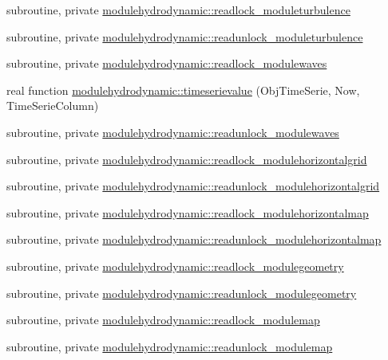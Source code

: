 \begin{DoxyCompactItemize}
\item 
subroutine, private \mbox{\hyperlink{namespacemodulehydrodynamic_aca47e0fe75006cf9be3be10af982ba2c}{modulehydrodynamic\+::readlock\+\_\+moduleturbulence}}
\item 
subroutine, private \mbox{\hyperlink{namespacemodulehydrodynamic_a894329be6f1d95af1f87b82950558271}{modulehydrodynamic\+::readunlock\+\_\+moduleturbulence}}
\item 
subroutine, private \mbox{\hyperlink{namespacemodulehydrodynamic_af607bb807c6d67a54a48586646880d77}{modulehydrodynamic\+::readlock\+\_\+modulewaves}}
\item 
real function \mbox{\hyperlink{namespacemodulehydrodynamic_a5ac5205b827b25fab464de95d2c838bf}{modulehydrodynamic\+::timeserievalue}} (Obj\+Time\+Serie, Now, Time\+Serie\+Column)
\item 
subroutine, private \mbox{\hyperlink{namespacemodulehydrodynamic_a652c0bf5742de7f1bc1ccdd771297bbc}{modulehydrodynamic\+::readunlock\+\_\+modulewaves}}
\item 
subroutine, private \mbox{\hyperlink{namespacemodulehydrodynamic_a87327c743a7173e47122b62474c77ea7}{modulehydrodynamic\+::readlock\+\_\+modulehorizontalgrid}}
\item 
subroutine, private \mbox{\hyperlink{namespacemodulehydrodynamic_aaf0ec07ca1129c3b8498e92e10e49f10}{modulehydrodynamic\+::readunlock\+\_\+modulehorizontalgrid}}
\item 
subroutine, private \mbox{\hyperlink{namespacemodulehydrodynamic_a2b7951ef8d3385a7141d22cbca764a93}{modulehydrodynamic\+::readlock\+\_\+modulehorizontalmap}}
\item 
subroutine, private \mbox{\hyperlink{namespacemodulehydrodynamic_af77f71622ac304600bd312437b8af339}{modulehydrodynamic\+::readunlock\+\_\+modulehorizontalmap}}
\item 
subroutine, private \mbox{\hyperlink{namespacemodulehydrodynamic_a1a5e2244778fa6a2caa0ff13ec7eb67b}{modulehydrodynamic\+::readlock\+\_\+modulegeometry}}
\item 
subroutine, private \mbox{\hyperlink{namespacemodulehydrodynamic_a987bae5d3ffa9f3fc96e0dfa2ead01ad}{modulehydrodynamic\+::readunlock\+\_\+modulegeometry}}
\item 
subroutine, private \mbox{\hyperlink{namespacemodulehydrodynamic_aefa0a7b600df8e249667d3541b45ecf1}{modulehydrodynamic\+::readlock\+\_\+modulemap}}
\item 
subroutine, private \mbox{\hyperlink{namespacemodulehydrodynamic_a5265f8f84b5dfafbb654e42da68f00af}{modulehydrodynamic\+::readunlock\+\_\+modulemap}}

\end{DoxyCompactItemize}

